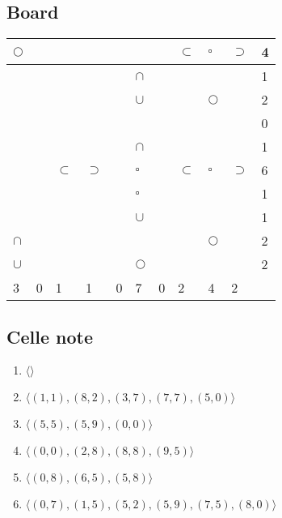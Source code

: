 \documentclass[11pt]{article}
\begin{document}
\subsection{Board}
\begin{table}[H]
    \begin{tabular}{|l|l|l|l|l|l|l|l|l|l||l|}
    \hline
     $\Circle$ &  &  &  &  &  &  & $\subset$ & $\square$ & $\supset$ & 4 \\ \hline
     &  &  &  &  & $\cap$ &  &  &  &  & 1 \\ \hline
     &  &  &  &  & $\cup$ &  &  & $\Circle$ &  & 2 \\ \hline
     &  &  &  &  &  &  &  &  &  & 0 \\ \hline
     &  &  &  &  & $\cap$ &  &  &  &  & 1 \\ \hline
     &  & $\subset$ & $\supset$ &  & $\square$ &  & $\subset$ & $\square$ & $\supset$ & 6 \\ \hline
     &  &  &  &  & $\square$ &  &  &  &  & 1 \\ \hline
     &  &  &  &  & $\cup$ &  &  &  &  & 1 \\ \hline
     $\cap$ &  &  &  &  &  &  &  & $\Circle$ &  & 2 \\ \hline
     $\cup$ &  &  &  &  & $\Circle$ &  &  &  &  & 2 \\ \hline \hline
     3 & 0 & 1 & 1 & 0 & 7 & 0 & 2 & 4 & 2 & \\ \hline
    \end{tabular}
\end{table}

\subsection{Celle note}
\begin{enumerate}
    \item $\langle \rangle$
    \item $\langle (1, 1), (8, 2), (3, 7), (7, 7), (5, 0) \rangle$
    \item $\langle (5, 5), (5, 9), (0, 0) \rangle$
    \item $\langle (0, 0), (2, 8), (8, 8), (9, 5) \rangle$
    \item $\langle (0, 8), (6, 5), (5, 8) \rangle$
    \item $\langle (0, 7), (1, 5), (5, 2), (5, 9), (7, 5), (8, 0) \rangle$
\end{enumerate}
\end{document}
